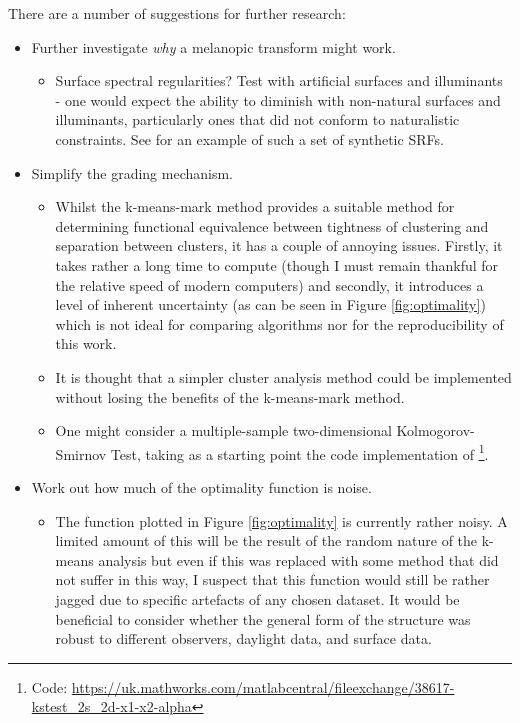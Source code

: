 There are a number of suggestions for further research:
\begin{itemize}
\item Further investigate \emph{why} a melanopic transform might work.
\begin{itemize}
\item Surface spectral regularities? Test with artificial surfaces and illuminants - one would expect the ability to diminish with non-natural surfaces and illuminants, particularly ones that did not conform to naturalistic constraints. See \citet[p. 239-40]{macdonald_realistic_2014} for an example of such a set of synthetic \glspl{SRF}.
\end{itemize}
\item Simplify the grading mechanism.
\begin{itemize}
    \item Whilst the k-means-mark method provides a suitable method for determining functional equivalence between tightness of clustering and separation between clusters, it has a couple of annoying issues. Firstly, it takes rather a long time to compute (though I must remain thankful for the relative speed of modern computers) and secondly, it introduces a level of inherent uncertainty (as can be seen in Figure \ref{fig:optimality}) which is not ideal for comparing algorithms nor for the reproducibility of this work.
    \item It is thought that a simpler cluster analysis method could be implemented without losing the benefits of the k-means-mark method.
    \item One might consider a multiple-sample two-dimensional Kolmogorov-Smirnov Test, taking as a starting point the code implementation of \citet{peacock_two-dimensional_1983}\footnote{Code: \url{https://uk.mathworks.com/matlabcentral/fileexchange/38617-kstest_2s_2d-x1-x2-alpha}}.
\end{itemize}
\item Work out how much of the optimality function is noise.
\begin{itemize}
\item The function plotted in Figure \ref{fig:optimality} is currently rather noisy. A limited amount of this will be the result of the random nature of the k-means analysis but even if this was replaced with some method that did not suffer in this way, I suspect that this function would still be rather jagged due to specific artefacts of any chosen dataset. It would be beneficial to consider whether the general form of the structure was robust to different observers, daylight data, and surface data.

\end{itemize}
\end{itemize}

